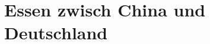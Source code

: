 \chapter{Essen zwisch China und Deutschland}
\startcontents[chapters]
\begin{minipage}{0.7\linewidth}
\end{minipage}
\cleardoubleemptypage



\stopcontents[chapters]